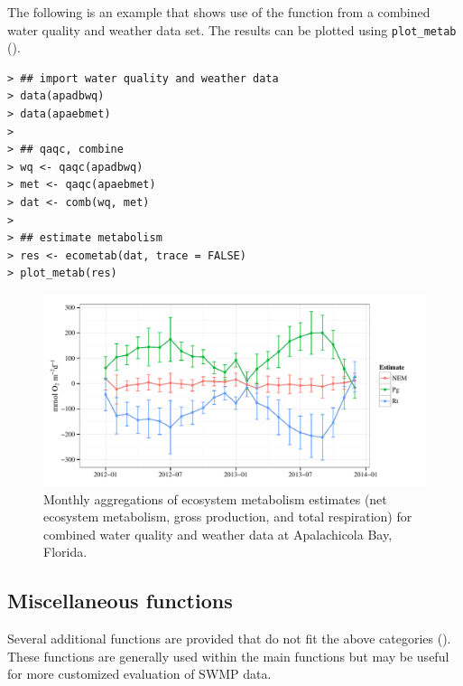 \documentclass[10pt,letterpaper]{article}\usepackage[]{graphicx}\usepackage[]{color}
\makeatletter
\def\maxwidth{ %
  \ifdim\Gin@nat@width>\linewidth
    \linewidth
  \else
    \Gin@nat@width
  \fi
}
\newenvironment{kframe}{%
 \def\at@end@of@kframe{}%
 \ifinner\ifhmode%
  \def\at@end@of@kframe{\end{minipage}}%
  \begin{minipage}{\columnwidth}%
 \fi\fi%
 \def\FrameCommand##1{\hskip\@totalleftmargin \hskip-\fboxsep
 \colorbox{shadecolor}{##1}\hskip-\fboxsep
     \hskip-\linewidth \hskip-\@totalleftmargin \hskip\columnwidth}%
 \MakeFramed {\advance\hsize-\width
   \@totalleftmargin\z@ \linewidth\hsize
   \@setminipage}}%
 {\par\unskip\endMakeFramed%
 \at@end@of@kframe}
\newenvironment{knitrout}{}{} %
\makeatother
\begin{document}
The following is an example that shows use of the function from a combined water quality and weather data set.  The results can be plotted using \texttt{plot\_metab} ().

\begin{knitrout}
\color{fgcolor}\begin{kframe}
\begin{verbatim}
> ## import water quality and weather data
> data(apadbwq)
> data(apaebmet)
> 
> ## qaqc, combine
> wq <- qaqc(apadbwq)
> met <- qaqc(apaebmet)
> dat <- comb(wq, met)
> 
> ## estimate metabolism
> res <- ecometab(dat, trace = FALSE)
> plot_metab(res)
\end{verbatim}
\end{kframe}\begin{figure}[!ht]


{\centering \includegraphics[width=\maxwidth]{figure/metab_ex} 

}

\caption[Monthly aggregations of ecosystem metabolism estimates (net ecosystem metabolism, gross production, and total respiration) for combined water quality and weather data at Apalachicola Bay, Florida]{Monthly aggregations of ecosystem metabolism estimates (net ecosystem metabolism, gross production, and total respiration) for combined water quality and weather data at Apalachicola Bay, Florida.\label{fig:metab_ex}}
\end{figure}


\end{knitrout}

\subsection*{Miscellaneous functions}

Several additional functions are provided that do not fit the above categories ().  These functions are generally used within the main functions but may be useful for more customized evaluation of \ac{SWMP} data.  
\end{document}
